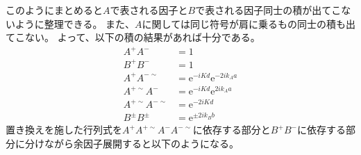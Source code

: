 \documentclass[autodetect-engine,dvipdfmx-if-dvi,ja=standard,a4paper,layout=v2]{bxjsreport}
\begin{document}
    このようにまとめると$A$で表される因子と$B$で表される因子同士の積が出てこないように整理できる。
    また、$A$に関しては同じ符号が肩に乗るもの同士の積も出てこない。
    よって、以下の積の結果があれば十分である。
    \begin{align}
    A^+A^-&=1\nonumber\\
    B^+B^-&=1\nonumber\\
    A^+A^{-\sim}&=\mathrm{e}^{-iKd}\mathrm{e}^{-2ik_Aa}\nonumber\\
    A^{+\sim}A^-&=\mathrm{e}^{-iKd}\mathrm{e}^{2ik_Aa}\nonumber\\
    A^{+\sim}A^{-\sim}&=\mathrm{e}^{-2iKd}\nonumber\\
    B^\pm B^\pm &= \mathrm{e}^{\pm 2ik_Bb}
    \end{align}
    置き換えを施した行列式を$A^+A^{+\sim}A^-A^{-\sim}$に依存する部分と$B^+B^-$に依存する部分に分けながら余因子展開すると以下のようになる。
\end{document}
